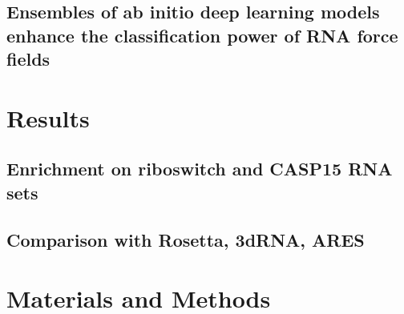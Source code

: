 \documentclass[%
 aip,
 amsmath,amssymb,
 reprint,%
]{revtex4-1}
\begin{document}
\subsection{Ensembles of ab initio deep learning models enhance the classification power of RNA force fields}

\section{Results}

\subsection{Enrichment on riboswitch and CASP15 RNA sets}

\subsection{Comparison with Rosetta, 3dRNA, ARES}

\section{Materials and Methods}
\end{document}
